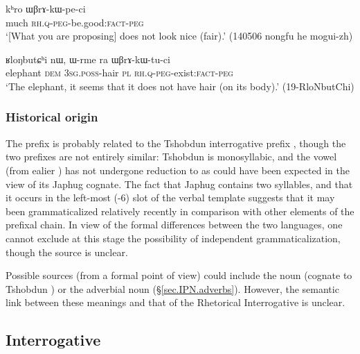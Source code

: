 \begin{exe}
\ex \label{ex:khro.WBrAkWpeci}
 \gll kʰro ɯβrɤ-kɯ-pe-ci \\
 much \textsc{rh}.\textsc{q}-\textsc{peg}-be.good:\textsc{fact}-\textsc{peg} \\
\glt `[What you are proposing] does not look nice (fair).' (140506 nongfu he mogui-zh) 
\end{exe}

\begin{exe}
\ex \label{ex:WBrAkWtuci}
 \gll ʁloŋbutɕʰi nɯ, ɯ-rme ra ɯβrɤ-kɯ-tu-ci \\
 elephant \textsc{dem} \textsc{3sg}.\textsc{poss}-hair \textsc{pl} \textsc{rh}.\textsc{q}-\textsc{peg}-exist:\textsc{fact}-\textsc{peg} \\
\glt `The elephant, it seems that it does not have hair (on its body).' (19-RloNbutChi) 
\end{exe}


\subsubsection{Historical origin} \label{sec:WBrA.history}
The prefix  is probably related to the Tshobdun interrogative prefix   \citep[397]{jackson19tshobdun}, though the two prefixes are not entirely similar: Tshobdun  is monosyllabic, and the vowel  (from ealier ) has not undergone reduction to  as could have been expected in the view of its Japhug cognate. The fact that Japhug  contains two syllables, and that it occurs in the left-most (-6) slot of the verbal template suggests that it may been grammaticalized relatively recently in comparison with other elements of the prefixal chain. In view of the formal differences between the two languages, one cannot exclude at this stage the possibility of independent grammaticalization, though the source is unclear. 

Possible sources (from a formal point of view) could include the noun  (cognate to Tshobdun ) or the  adverbial noun  (§\ref{sec.IPN.adverbs}). However, the semantic link between these meanings and that of the Rhetorical Interrogative is unclear. 

 \subsection{Interrogative} \label{sec:interrogative.W} 
